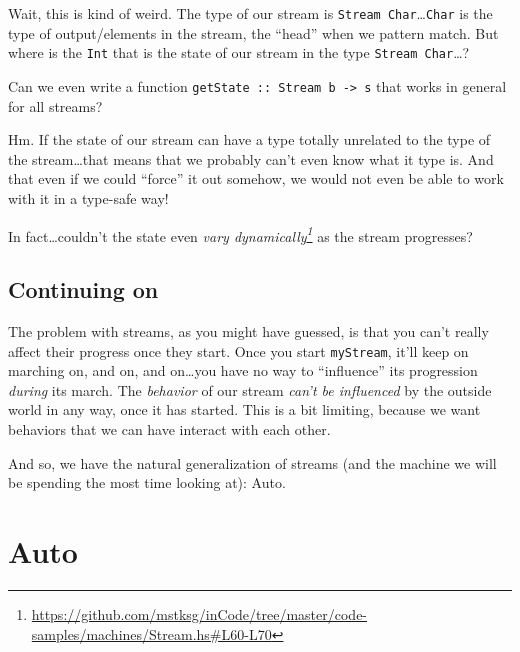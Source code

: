 \documentclass[]{article}
\newenvironment{Shaded}{}{}
\newcommand{\DecValTok}[1]{\textcolor[rgb]{0.25,0.63,0.44}{#1}}
\newcommand{\FunctionTok}[1]{\textcolor[rgb]{0.02,0.16,0.49}{#1}}
\newcommand{\NormalTok}[1]{#1}
\newcommand{\OperatorTok}[1]{\textcolor[rgb]{0.40,0.40,0.40}{#1}}
\newcommand{\StringTok}[1]{\textcolor[rgb]{0.25,0.44,0.63}{#1}}
\renewcommand{\href}[2]{#2\footnote{\url{#1}}}
\begin{document}
\begin{Shaded}
\end{Shaded}

Wait, this is kind of weird. The type of our stream is
\texttt{Stream\ Char}\ldots{}\texttt{Char} is the type of output/elements in the
stream, the ``head'' when we pattern match. But where is the \texttt{Int} that
is the state of our stream in the type \texttt{Stream\ Char}\ldots?

Can we even write a function
\texttt{getState\ ::\ Stream\ b\ -\textgreater{}\ s} that works in general for
all streams?

Hm. If the state of our stream can have a type totally unrelated to the type of
the stream\ldots that means that we probably can't even know what it type is.
And that even if we could ``force'' it out somehow, we would not even be able to
work with it in a type-safe way!

In fact\ldots couldn't the state even
\emph{\href{https://github.com/mstksg/inCode/tree/master/code-samples/machines/Stream.hs\#L60-L70}{vary
dynamically}} as the stream progresses?

\subsection{Continuing on}\label{continuing-on}

The problem with streams, as you might have guessed, is that you can't really
affect their progress once they start. Once you start \texttt{myStream}, it'll
keep on marching on, and on, and on\ldots you have no way to ``influence'' its
progression \emph{during} its march. The \emph{behavior} of our stream
\emph{can't be influenced} by the outside world in any way, once it has started.
This is a bit limiting, because we want behaviors that we can have interact with
each other.

And so, we have the natural generalization of streams (and the machine we will
be spending the most time looking at): Auto.

\section{Auto}\label{auto}
\end{document}
